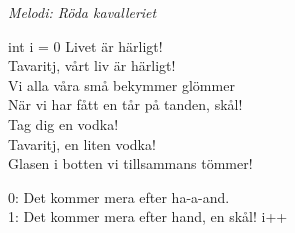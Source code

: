 {\footnotesize\textit{Melodi: Röda kavalleriet}}\par
\vspace{10pt}
int i = 0
\revrpt Livet är härligt!\\
Tavaritj, vårt liv är härligt!\\
Vi alla våra små bekymmer glömmer\\
När vi har fått en tår på tanden, skål!\\
Tag dig en vodka!\\
Tavaritj, en liten vodka!\\
Glasen i botten vi tillsammans tömmer!\par
\vspace{10pt}
0: Det kommer mera efter ha-a-and.\\
1: Det kommer mera efter hand, en skål!
i++\rpt

